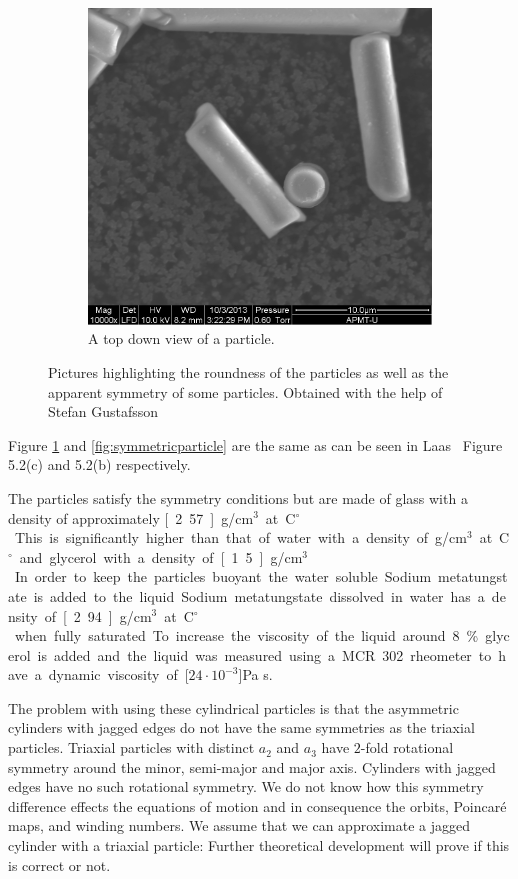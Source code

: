 \begin{figure}[H]
\begin{subfigure}[3b]{0.40\textwidth}
\includegraphics[width=\textwidth]{figures/method/round.png}
\caption{A top down view of a particle.}\label{fig:roundparticle}
\end{subfigure}
\caption{Pictures highlighting the roundness of the particles as well as the apparent symmetry of some particles. Obtained with the help of Stefan Gustafsson}
\label{fig:particlepictures2}
\end{figure}

\noindent Figure \ref{fig:roundparticle} and \ref{fig:symmetricparticle} are the same as can be seen in Laas~\cite{alexanderThesis} Figure 5.2(c) and 5.2(b) respectively. 

The particles satisfy the symmetry conditions but are made of glass with a density of approximately 
\unit[2.57]{g/cm$^3$} at \unit[20]{C$^\circ$}. This is significantly higher than that of water with a density of 
\unit[1]{g/cm$^3$} at \unit[20]{C$^\circ$} and glycerol with a density of \unit[1.5]{g/cm$^3$}. In order to keep the particles buoyant the water soluble Sodium metatungstate is added to the liquid. Sodium metatungstate dissolved in water has a density of \unit[2.94]{g/cm$^3$} at \unit[20]{C$^\circ$} when fully saturated. To increase the viscosity of the liquid around 8\% glycerol is added and the liquid was measured using a MCR 302 rheometer to have a dynamic viscosity of \unit[$24\cdot 10^{-3}$]{Pa s}.

The problem with using these cylindrical particles is that the asymmetric cylinders with jagged edges do not have the same symmetries as the triaxial particles. Triaxial particles with distinct $a_2$ and $a_3$ have $2$-fold rotational symmetry around the minor, semi-major and major axis. Cylinders with jagged edges have no such rotational symmetry. We do not know how this symmetry difference effects the equations of motion and in consequence the orbits, Poincaré maps, and winding numbers. We assume that we can approximate a jagged cylinder with a triaxial particle: Further theoretical development will prove if this is correct or not.
